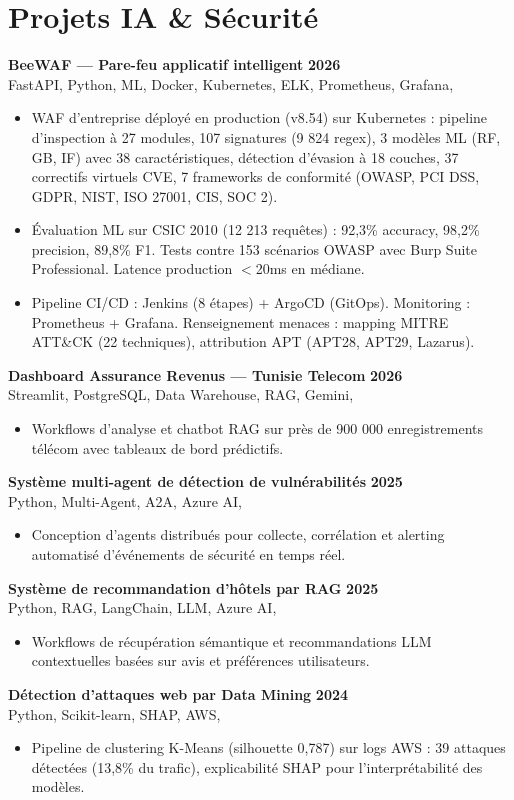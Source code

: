 \documentclass[a4paper,10pt]{article}
\newcommand{\cventry}[4]{\textbf{#1} \hfill \textbf{#4}\\[1pt]#2{\ifx\relax#3\relax\else, #3\fi}\par\vspace{2pt}}
\begin{document}
\section{Projets IA \& Sécurité}
\cventry{BeeWAF — Pare-feu applicatif intelligent}{FastAPI, Python, ML, Docker, Kubernetes, ELK, Prometheus, Grafana}{}{2026}
\begin{itemize}
  \item WAF d'entreprise déployé en production (v8.54) sur Kubernetes : pipeline d'inspection à 27 modules, 107 signatures (9 824 regex), 3 modèles ML (RF, GB, IF) avec 38 caractéristiques, détection d'évasion à 18 couches, 37 correctifs virtuels CVE, 7 frameworks de conformité (OWASP, PCI DSS, GDPR, NIST, ISO 27001, CIS, SOC 2).
  \item Évaluation ML sur CSIC 2010 (12 213 requêtes) : 92,3\% accuracy, 98,2\% precision, 89,8\% F1. Tests contre 153 scénarios OWASP avec Burp Suite Professional. Latence production $<$20ms en médiane.
  \item Pipeline CI/CD : Jenkins (8 étapes) + ArgoCD (GitOps). Monitoring : Prometheus + Grafana. Renseignement menaces : mapping MITRE ATT\&CK (22 techniques), attribution APT (APT28, APT29, Lazarus).
\end{itemize}
\cventry{Dashboard Assurance Revenus — Tunisie Telecom}{Streamlit, PostgreSQL, Data Warehouse, RAG, Gemini}{}{2026}
\begin{itemize}
  \item Workflows d'analyse et chatbot RAG sur près de 900 000 enregistrements télécom avec tableaux de bord prédictifs.
\end{itemize}
\cventry{Système multi-agent de détection de vulnérabilités}{Python, Multi-Agent, A2A, Azure AI}{}{2025}
\begin{itemize}
  \item Conception d'agents distribués pour collecte, corrélation et alerting automatisé d'événements de sécurité en temps réel.
\end{itemize}
\cventry{Système de recommandation d'hôtels par RAG}{Python, RAG, LangChain, LLM, Azure AI}{}{2025}
\begin{itemize}
  \item Workflows de récupération sémantique et recommandations LLM contextuelles basées sur avis et préférences utilisateurs.
\end{itemize}
\cventry{Détection d'attaques web par Data Mining}{Python, Scikit-learn, SHAP, AWS}{}{2024}
\begin{itemize}
  \item Pipeline de clustering K-Means (silhouette 0,787) sur logs AWS : 39 attaques détectées (13,8\% du trafic), explicabilité SHAP pour l'interprétabilité des modèles.
\end{itemize}
\end{document}
